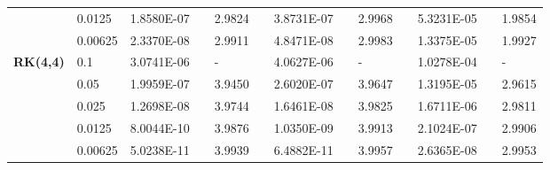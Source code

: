 \documentclass[aspectratio=169]{beamer}
\numberwithin{theorem}{section} %
\begin{document}
\begin{frame}
\begin{table}[H]
\begin{tabular}{lllllrlrlrlrlrl}
		\multicolumn{2}{l}{} & \multicolumn{2}{l}{0.0125} & 1.8580E-07 &       & 2.9824  &       & 3.8731E-07 &       & 2.9968  &       & 5.3231E-05 &       & 1.9854  \\
		\multicolumn{2}{l}{} & \multicolumn{2}{l}{0.00625} & 2.3370E-08 &       & 2.9911  &       & 4.8471E-08 &       & 2.9983  &       & 1.3375E-05 &       & 1.9927  \\
		\multicolumn{2}{l}{\multirow{5}[1]{*}{\textbf{RK(4,4)}}} & \multicolumn{2}{l}{0.1} & 3.0741E-06 &       & -     &       & 4.0627E-06 &       & -     &       & 1.0278E-04 &       & - \\
		\multicolumn{2}{l}{} & \multicolumn{2}{l}{0.05} & 1.9959E-07 &       & 3.9450  &       & 2.6020E-07 &       & 3.9647  &       & 1.3195E-05 &       & 2.9615  \\
		\multicolumn{2}{l}{} & \multicolumn{2}{l}{0.025} & 1.2698E-08 &       & 3.9744  &       & 1.6461E-08 &       & 3.9825  &       & 1.6711E-06 &       & 2.9811  \\
		\multicolumn{2}{l}{} & \multicolumn{2}{l}{0.0125} & 8.0044E-10 &       & 3.9876  &       & 1.0350E-09 &       & 3.9913  &       & 2.1024E-07 &       & 2.9906  \\
		\multicolumn{2}{l}{} & \multicolumn{2}{l}{0.00625} & 5.0238E-11 &       & 3.9939  &       & 6.4882E-11 &       & 3.9957  &       & 2.6365E-08 &       & 2.9953  \\
		\bottomrule
		\end{tabular}%
		\label{tab_SAVRRK:6-4}%
		\end{table}%
\end{frame}
\end{document}
